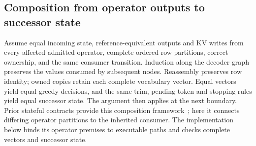 \subsection{Composition from operator outputs to successor state}
Assume equal incoming state, reference-equivalent outputs and KV writes from every affected admitted operator, complete ordered row partitions, correct ownership, and the same consumer transition. Induction along the decoder graph preserves the values consumed by subsequent nodes. Reassembly preserves row identity; owned copies retain each complete vocabulary vector. Equal vectors yield equal greedy decisions, and the same trim, pending-token and stopping rules yield equal successor state. The argument then applies at the next boundary. Prior stateful contracts provide this composition framework~\cite{vosti}; here it connects differing operator partitions to the inherited consumer. The implementation below binds its operator premises to executable paths and checks complete vectors and successor state.
